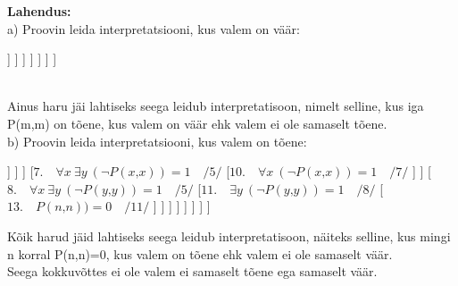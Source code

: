\documentclass[fullpage]{article}
\begin{document}
\textbf{Lahendus:}\\
a) Proovin leida interpretatsiooni, kus valem on v\"a\"ar:\\
\begin{forest}
	[$1.\quad \forall x\ \exists y\ ((\neg P(x\text{,}y)\vee P(y\text{,}x))\Rightarrow(P(x\text{,}x)\Rightarrow\neg P(y\text{,}y)))\mathrel{=}0$
		[$2.\quad \exists y\ ((\neg P(m\text{,}y)\vee P(y\text{,}m))\Rightarrow(P(m\text{,}m)\Rightarrow\neg P(y\text{,}y)))\mathrel{=}0\quad /1/$
			[$3.\quad (\neg P(m\text{,}m)\vee P(m\text{,}m))\Rightarrow(P(m\text{,}m)\Rightarrow\neg P(m\text{,}m))\mathrel{=}0\quad /2/$
				[$4.\quad 1\Rightarrow(P(m\text{,}m)\Rightarrow\neg P(m\text{,}m))\mathrel{=}0\quad /3/$
					[$5.\quad P(m\text{,}m)\Rightarrow\neg P(m\text{,}m)\mathrel{=}0\quad /4/$
						[$6.\quad P(m\text{,}m)\mathrel{=}1\quad /5/$
							[$7.\quad \neg P(m\text{,}m)\mathrel{=}0\quad /5/$
							[$8.\quad P(m\text{,}m)\mathrel{=}1\quad /7/$
							]
							]
						]
					]
				]
			]
		]
	]
\end{forest}\\
Ainus haru j\"ai lahtiseks seega leidub interpretatisoon, nimelt selline, kus iga P(m,m) on tõene, kus valem on v\"a\"ar ehk valem ei ole samaselt t\~oene.\\\newpage
b) Proovin leida interpretatsiooni, kus valem on t\~oene:\\
\begin{center}
\begin{forest}
	[$1.\quad \forall x\ \exists y\ ((\neg P(x\text{,}y)\vee P(y\text{,}x))\Rightarrow(P(x\text{,}x)\Rightarrow\neg P(y\text{,}y)))\mathrel{=}1$
		[$2.\quad \forall x\ \exists y\ (\neg(\neg P(x\text{,}y)\vee P(y\text{,}x))\vee(P(x\text{,}x)\Rightarrow\neg P(y\text{,}y)))\mathrel{=}1\quad /1/$
			[$3.\quad \forall x\ \exists y\ ((P(x\text{,}y)\ \&\ \neg P(y\text{,}x))\vee(\neg P(x\text{,}x)\vee\neg P(y\text{,}y)))\mathrel{=}1\quad /2/$
				[$4.\quad \forall x\ (\exists y\ (P(x\text{,}y)\ \&\ \neg P(y\text{,}x))\vee\exists y\ \neg P(x\text{,}x)\vee\exists y\ \neg P(y\text{,}y))\mathrel{=}1\quad /3/$
					[$5.\quad \forall x\ \exists y\ (P(x\text{,}y)\ \&\ \neg P(y\text{,}x))\vee\forall x\ \exists y\ \neg P(x\text{,}x)\vee\forall x\ \exists y\ \neg P(y\text{,}y)\mathrel{=}1\quad /4/$
						[$6.\quad \forall x\ \exists y\ (P(x\text{,}y)\ \&\ \neg P(y\text{,}x))\mathrel{=}1\quad /5/$
							[$9.\quad \forall x\ \exists y\ P(x\text{,}y)\ \&\ \forall x\ \exists y\ \neg P(y\text{,}x)\mathrel{=}1\quad /6/$
								[$12.\quad \forall x\ \exists y\ P(x\text{,}y)\mathrel{=}1\quad /9/$
								[$14.\quad \forall x\ \exists y\ \neg P(y\text{,}x)\mathrel{=}1\quad /12/$
								]
								]
							]
						]
						[$7.\quad \forall x\ \exists y\ (\neg P(x\text{,}x))\mathrel{=}1\quad /5/$
						[$10.\quad \forall x\ (\neg P(x\text{,}x))\mathrel{=}1\quad /7/$
						]
						]
						[$8.\quad \forall x\ \exists y\ (\neg P(y\text{,}y))\mathrel{=}1\quad /5/$
						[$11.\quad \exists y\ (\neg P(y\text{,}y))\mathrel{=}1\quad /8/$
						[$13.\quad P(n\text{,}n))\mathrel{=}0\quad /11/$
						]
						]
						]
					]
				]
			]
		]
	]
\end{forest}
\end{center}
K\~oik harud j\"aid lahtiseks seega leidub interpretatisoon, näiteks selline, kus mingi n korral P(n,n)=0, kus valem on t\~oene ehk valem ei ole samaselt v\"a\"ar.\\
Seega kokkuv\~ottes ei ole valem ei samaselt t\~oene ega samaselt v\"a\"ar.
\end{document}
